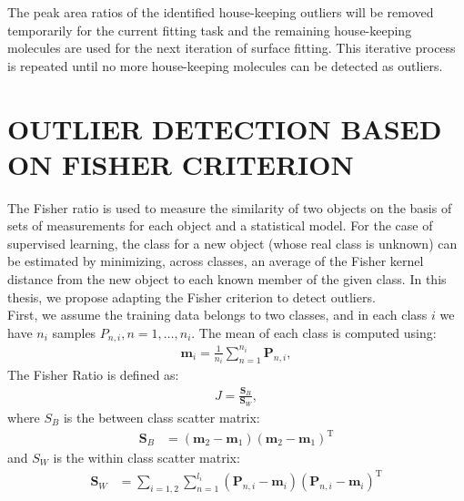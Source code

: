 The peak area ratios of the identified house-keeping outliers will be removed temporarily for the current fitting task and the remaining house-keeping molecules are used for the next iteration of surface fitting. This iterative process is repeated until no more house-keeping molecules can be detected as outliers. 

\chapter{OUTLIER DETECTION BASED ON FISHER CRITERION}
\indent The Fisher ratio \cite{fld} is used to measure the similarity of two objects on the basis of sets of measurements for each object and a statistical model. For the case of supervised learning, the class for a new object (whose real class is unknown) can be estimated by minimizing, across classes, an average of the Fisher kernel distance from the new object to each known member of the given class. In this thesis, we propose adapting the Fisher criterion to detect outliers.\\
\indent First, we assume the training data belongs to two classes, and in each class $i$ we have $n_i$ samples $P_{n,i}, n=1,\dots , n_i$. The mean of each class is computed using:
\begin{eqnarray}
{\mathbf  {m}}_{i}={\frac  {1}{n_{i}}}\sum _{{n=1}}^{{n_{i}}}{\mathbf  {P}}_{n,i},
\end{eqnarray}
The Fisher Ratio is defined as:
\begin{eqnarray}\label{ratio}
J={\frac  {{\mathbf  {S}}_{B}}{{\mathbf  {S}}_{W}}},
\end{eqnarray}
where $S_B$ is the between class scatter matrix:
\begin{eqnarray}
{\mathbf  {S}}_{B}&=({\mathbf  {m}}_{2}-{\mathbf  {m}}_{1})({\mathbf  {m}}_{2}-{\mathbf  {m}}_{1})^{{{\text{T}}}}
\end{eqnarray}
and $S_W$ is the within class scatter matrix:
\begin{eqnarray}
{\mathbf  {S}}_{W}&=\sum _{{i=1,2}}\sum _{{n=1}}^{{l_{i}}}({\mathbf  {P}}_{n,i}-{\mathbf  {m}}_{i})({\mathbf  {P}}_{n,i}-{\mathbf  {m}}_{i})^{{{\text{T}}}}
\end{eqnarray}


